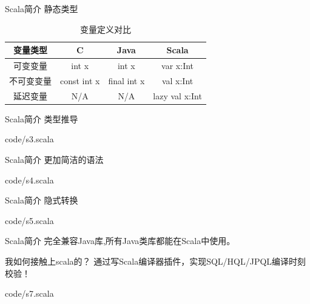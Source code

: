 \documentclass[10pt,aspectratio=43,mathserif,table]{beamer}
\begin{document}
\begin{frame}{Scala简介}
  静态类型
  \begin{table}
    \caption{变量定义对比}
    \begin{tabular}{|c|c|c|c|}
      \hline 
      \textbf{变量类型} & \textbf{C} & \textbf{Java} & \textbf{Scala} \\ \hline
      可变变量 & int x & int x & var x:Int \\ \hline
      不可变变量 & const int x & final int x & val x:Int \\ \hline
      延迟变量& N/A & N/A & lazy val x:Int \\ \hline
    \end{tabular}
  \end{table}
\end{frame}

\begin{frame}{Scala简介}
  类型推导
  
  {code/s3.scala}
\end{frame}

\begin{frame}{Scala简介}
  更加简洁的语法
  
  {code/s4.scala}
\end{frame}

\begin{frame}{Scala简介}
  隐式转换
  
  {code/s5.scala}
\end{frame}

\begin{frame}{Scala简介}
  完全兼容Java库,所有Java类库都能在Scala中使用。
\end{frame}
\begin{frame}{我如何接触上scala的？}
  通过写Scala编译器插件，实现SQL/HQL/JPQL编译时刻校验！
  
  {code/s7.scala}
\end{frame}
\end{document}
